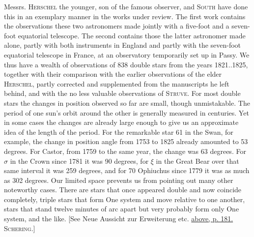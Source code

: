 Messrs. \textsc{Herschel} the younger, son of the famous observer, and \textsc{South} have done this in an exemplary manner in the works under review. The first work contains the observations these two astronomers made jointly with a five-foot and a seven-foot equatorial telescope. The second contains those the latter astronomer made alone, partly with both instruments in England and partly with the seven-foot equatorial telescope in France, at an observatory temporarily set up in Passy. We thus have a wealth of observations of 838 double stars from the years 1821..1825, together with their comparison with the earlier observations of the elder \textsc{Herschel}, partly corrected and supplemented from the manuscripts he left behind, and with the no less valuable observations of \textsc{Struve}. For most double stars the changes in position observed so far are small, though unmistakable. The period of one sun's orbit around the other is generally measured in centuries. Yet in some cases the changes are already large enough to give us an approximate idea of the length of the period. For the remarkable star 61 in the Swan, for example, the change in position angle from 1753 to 1825 already amounted to 53 degrees. For Castor, from 1759 to the same year, the change was 63 degrees. For $\sigma$ in the Crown since 1781 it was 90 degrees, for $\xi$ in the Great Bear over that same interval it was 259 degrees, and for 70 Ophiuchus since 1779 it was as much as 302 degrees. Our limited space prevents us from pointing out many other noteworthy cases. There are stars that once appeared double and now coincide completely, triple stars that form One system and move relative to one another, stars that stand twelve minutes of arc apart but very probably form only One system, and the like. [See Neue Aussicht zur Erweiterung etc. \hyperlink{native-186}{above, p. 181.} \textsc{Schering}.]
